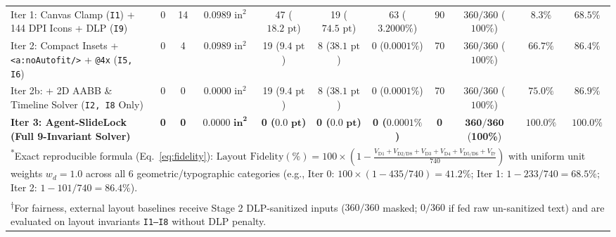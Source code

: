 \documentclass[10pt,journal,compsoc]{IEEEtran}
\begin{document}
\begin{table}[t]
{\begin{tabular}{lcccccccccc}
Iter 1: Canvas Clamp (\texttt{I1}) + 144 DPI Icons + DLP (\texttt{I9}) & 0 & 14 & $0.0989\text{ in}^2$ & 47 ($18.2\text{ pt}$) & 19 ($74.5\text{ pt}$) & 63 ($3.2000\%$) & 90 & $360/360$ ($100\%$) & $8.3\%$ & $68.5\%$ \\
Iter 2: Compact Insets + \texttt{<a:noAutofit/>} + \texttt{@4x} (\texttt{I5, I6}) & 0 & 4 & $0.0989\text{ in}^2$ & 19 ($9.4\text{ pt}$) & 8 ($38.1\text{ pt}$) & 0 ($0.0001\%$) & 70 & $360/360$ ($100\%$) & $66.7\%$ & $86.4\%$ \\
Iter 2b: + 2D AABB \& Timeline Solver (\texttt{I2, I8} Only) & 0 & 0 & $0.0000\text{ in}^2$ & 19 ($9.4\text{ pt}$) & 8 ($38.1\text{ pt}$) & 0 ($0.0001\%$) & 70 & $360/360$ ($100\%$) & $75.0\%$ & $86.9\%$ \\
\textbf{Iter 3: Agent-SlideLock (Full 9-Invariant Solver)} & \textbf{0} & \textbf{0} & $\mathbf{0.0000\text{ in}^2}$ & \textbf{0 ($\mathbf{0.0\text{ pt}}$)} & \textbf{0 ($\mathbf{0.0\text{ pt}}$)} & \textbf{0 ($\mathbf{0.0001\%}$)} & \textbf{0} & $\mathbf{360/360}$ (\textbf{100\%}) & $\mathbf{100.0\%}$ & $\mathbf{100.0\%}$ \\
\bottomrule
\multicolumn{11}{l}{\tiny \textsuperscript{*}Exact reproducible formula (Eq.~\ref{eq:fidelity}): $\text{Layout Fidelity}(\%) = 100 \times (1 - \frac{V_{\text{D1}} + V_{\text{D2/D8}} + V_{\text{D3}} + V_{\text{D4}} + V_{\text{D5/D6}} + V_{\text{I7}}}{740})$ with uniform unit weights $w_d = 1.0$ across all 6 geometric/typographic categories (e.g., Iter 0: $100\times(1 - 435/740)=41.2\%$; Iter 1: $1 - 233/740 = 68.5\%$; Iter 2: $1 - 101/740 = 86.4\%$).} \\
\multicolumn{11}{l}{\tiny \textsuperscript{$\dagger$}For fairness, external layout baselines receive Stage 2 DLP-sanitized inputs ($360/360$ masked; $0/360$ if fed raw un-sanitized text) and are evaluated on layout invariants \texttt{I1--I8} without DLP penalty.}
\end{tabular}%
}
\end{table}
\end{document}

